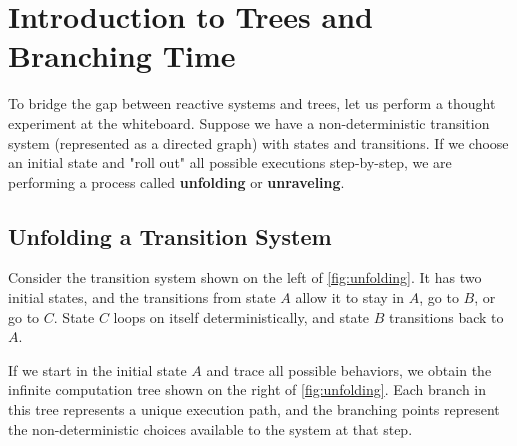 \section{Introduction to Trees and Branching Time}
\label{sec:intro-trees}

To bridge the gap between reactive systems and trees, let us perform a thought experiment at the whiteboard. Suppose we have a non-deterministic transition system (represented as a directed graph) with states and transitions. If we choose an initial state and "roll out" all possible executions step-by-step, we are performing a process called \textbf{unfolding} or \textbf{unraveling}.

\subsection{Unfolding a Transition System}
Consider the transition system shown on the left of \cref{fig:unfolding}. It has two initial states, and the transitions from state $A$ allow it to stay in $A$, go to $B$, or go to $C$. State $C$ loops on itself deterministically, and state $B$ transitions back to $A$.

If we start in the initial state $A$ and trace all possible behaviors, we obtain the infinite computation tree shown on the right of \cref{fig:unfolding}. Each branch in this tree represents a unique execution path, and the branching points represent the non-deterministic choices available to the system at that step.

